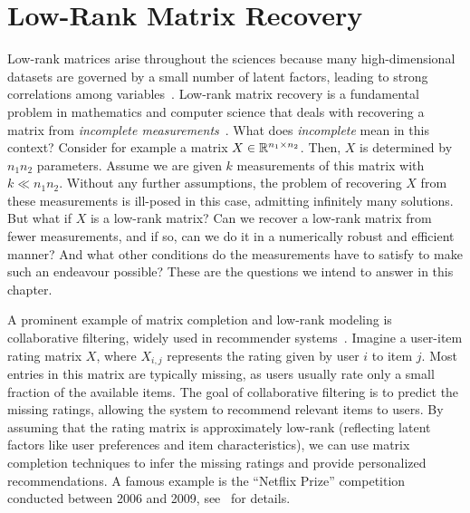 \chapter{Low-Rank Matrix Recovery}
\label{c:lowrank}

\newcommand{\PO}{P_{\Omega}}
\newcommand{\cA}{{\mathcal A}}
\newcommand{\Hn}{{\mathcal H}}
\newcommand{\Hnn}{{\mathcal H}_n}
\newcommand{\cT}{{\mathcal T}}
\newcommand{\Tp}{{\mathcal T}^{\perp}}
\newcommand{\cto}{{{\mathcal T}_{X_0}}}
\newcommand{\tpo}{{{\mathcal T}^{\perp}_{X_0}}}

Low-rank matrices arise throughout the sciences because many high-dimensional datasets are governed by a small number of latent factors, leading to strong correlations among variables~\cite{udell2019big}.
Low-rank matrix recovery is a fundamental problem in mathematics and computer science that deals with recovering a matrix
from {\em incomplete measurements}~\cite{WrightMa}. What does {\em incomplete} mean in this context? Consider for example a matrix
 $X \in \mathbb{R}^{n_1\times n_2}$. Then, $X$ is determined by $n_1 n_2$ parameters. Assume we are given  $k$ measurements of this matrix with $k \ll n_1n_2$. Without any further assumptions, the problem of recovering $X$ from these measurements is ill-posed in this case, admitting infinitely many solutions. 
But what if $X$ is a low-rank matrix? Can we recover a low-rank matrix from fewer measurements, and if so, can we do it in 
 a numerically robust and efficient manner? And what other conditions do the measurements have to satisfy to make such an endeavour possible? These are the questions we intend to answer in this chapter.

A prominent example of matrix completion and low-rank modeling is collaborative filtering, widely used in
recommender systems~\cite{koren2009matrix,agarwal2016statistical,udell2016generalized}.  Imagine a user-item rating matrix $X$, where $X_{i,j}$ represents the rating given by user
$i$ to item $j$.  Most entries in this matrix are typically missing, as users usually rate only a small fraction of the available items.  The goal of collaborative filtering is to predict the missing ratings, allowing the system to recommend relevant items to users.  By assuming that the rating matrix is approximately low-rank (reflecting latent factors like user preferences and item characteristics), we can use matrix completion techniques to infer the missing ratings and provide personalized recommendations.  A famous example is the ``Netflix Prize'' competition conducted between 2006 and 2009, see~\cite{netflix} for details.

